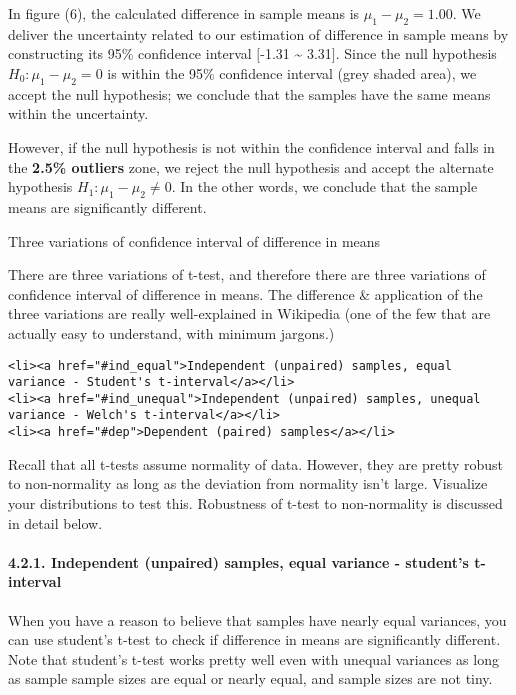 \documentclass[11pt]{article}
\begin{document}
In figure (6), the calculated difference in sample means is
{\(\mu_1 - \mu_2 = 1.00\)}. We deliver the uncertainty related to our
estimation of difference in sample means by constructing its {95\%
confidence interval \([\)-1.31 \textasciitilde{} 3.31\(]\)}. Since the
null hypothesis {\(H_0: \mu_1 - \mu_2 = 0\)} is within the 95\%
confidence interval ({grey shaded area}), we accept the null hypothesis;
we conclude that the samples have the same means within the uncertainty.

However, if the null hypothesis is not within the confidence interval
and falls in the \textbf{2.5\% outliers} zone, we reject the null
hypothesis and accept the alternate hypothesis
{\(H_1: \mu_1 - \mu_2 \neq 0\)}. In the other words, we conclude that
the sample means are significantly different.

    Three variations of confidence interval of difference in means

There are three variations of t-test, and therefore there are three
variations of confidence interval of difference in means. The difference
\& application of the three variations are really well-explained in
Wikipedia (one of the few that are actually easy to understand, with
minimum jargons.)

\begin{verbatim}
<li><a href="#ind_equal">Independent (unpaired) samples, equal variance - Student's t-interval</a></li>
<li><a href="#ind_unequal">Independent (unpaired) samples, unequal variance - Welch's t-interval</a></li>
<li><a href="#dep">Dependent (paired) samples</a></li>
\end{verbatim}

Recall that all t-tests assume normality of data. However, they are
pretty robust to non-normality as long as the deviation from normality
isn't large. Visualize your distributions to test this. Robustness of
t-test to non-normality is discussed in detail below.

    \hypertarget{ind_equal}{}

\paragraph{4.2.1. Independent (unpaired) samples, equal variance -
student's
t-interval}\label{independent-unpaired-samples-equal-variance---students-t-interval}

When you have a reason to believe that samples have nearly equal
variances, you can use student's t-test to check if difference in means
are significantly different. Note that student's t-test works pretty
well even with unequal variances as long as sample sample sizes are
equal or nearly equal, and sample sizes are not tiny.
\end{document}
